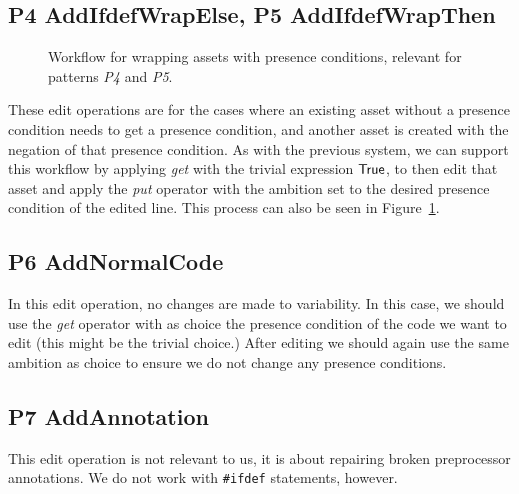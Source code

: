 \subsection*{P4 AddIfdefWrapElse, P5 AddIfdefWrapThen}
\begin{figure}
  \centering
  \caption{Workflow for wrapping assets with presence conditions, relevant for patterns \emph{P4} and \emph{P5}.}
  \label{fig:patterns:p4}
\end{figure}
These edit operations are for the cases where an existing asset without a
presence condition needs to get a presence condition, and another asset is
created with the negation of that presence condition. As with the previous
system, we can support this workflow by applying \emph{get} with the trivial
expression \({\sf True}\), to then edit that asset and apply the \emph{put}
operator with the ambition set to the desired presence condition of the
edited line. This process can also be seen in Figure~\ref{fig:patterns:p4}.

\subsection*{P6 AddNormalCode}
In this edit operation, no changes are made to variability. In this case, we
should use the \emph{get} operator with as choice the presence condition of the
code we want to edit (this might be the trivial choice.) After editing we
should again use the same ambition as choice to ensure we do not change any
presence conditions.

\subsection*{P7 AddAnnotation}
This edit operation is not relevant to us, it is about repairing broken 
preprocessor annotations. We do not work with \texttt{\#ifdef} statements,
however.

